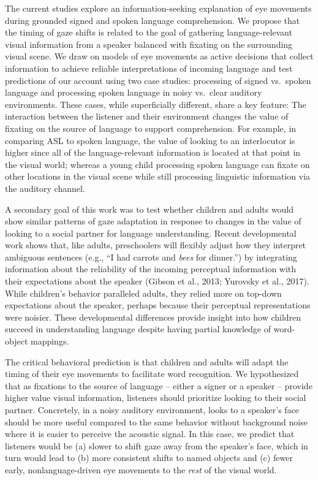 \documentclass[,man,floatsintext]{apa6}
\begin{document}
The current studies explore an information-seeking explanation of eye
movements during grounded signed and spoken language comprehension. We
propose that the timing of gaze shifts is related to the goal of
gathering language-relevant visual information from a speaker balanced
with fixating on the surrounding visual scene. We draw on models of eye
movements as active decisions that collect information to achieve
reliable interpretations of incoming language and test predictions of
our account using two case studies: processing of signed vs.~spoken
language and processing spoken language in noisy vs.~clear auditory
environments. These cases, while superficially different, share a key
feature: The interaction between the listener and their environment
changes the value of fixating on the source of language to support
comprehension. For example, in comparing ASL to spoken language, the
value of looking to an interlocutor is higher since all of the
language-relevant information is located at that point in the visual
world; whereas a young child processing spoken language can fixate on
other locations in the visual scene while still processing linguistic
information via the auditory channel.

A secondary goal of this work was to test whether children and adults
would show similar patterns of gaze adaptation in response to changes in
the value of looking to a social partner for language understanding.
Recent developmental work shows that, like adults, preschoolers will
flexibly adjust how they interpret ambiguous sentences (e.g., \enquote{I
had carrots and \emph{bees} for dinner.}) by integrating information
about the reliability of the incoming perceptual information with their
expectations about the speaker (Gibson et al., 2013; Yurovsky et al.,
2017). While children's behavior paralleled adults, they relied more on
top-down expectations about the speaker, perhaps because their
perceptual representations were noisier. These developmental differences
provide insight into how children succeed in understanding language
despite having partial knowledge of word-object mappings.

The critical behavioral prediction is that children and adults will
adapt the timing of their eye movements to facilitate word recognition.
We hypothesized that as fixations to the source of language -- either a
signer or a speaker -- provide higher value visual information,
listeners should prioritize looking to their social partner. Concretely,
in a noisy auditory environment, looks to a speaker's face should be
more useful compared to the same behavior without background noise where
it is easier to perceive the acoustic signal. In this case, we predict
that listeners would be (a) slower to shift gaze away from the speaker's
face, which in turn would lead to (b) more consistent shifts to named
objects and (c) fewer early, nonlanguage-driven eye movements to the
\emph{rest} of the visual world.
\end{document}
